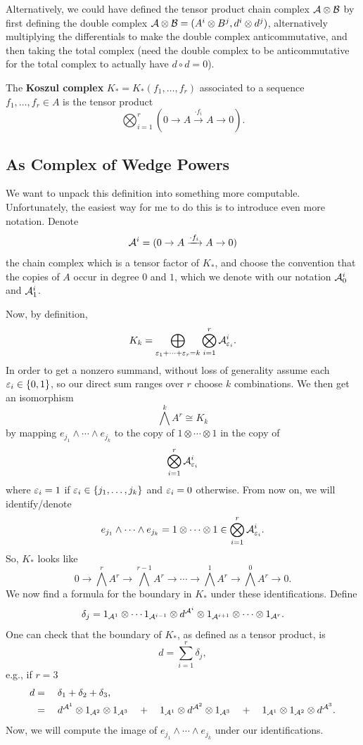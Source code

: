 \documentclass[12pt]{article}
\begin{document}
\begin{rmk}
    Alternatively, we could have defined the tensor product chain complex $\mathcal{A}\otimes \mathcal{B}$ by first defining the double complex $\mathcal{A}\otimes \mathcal{B} = (A^i\otimes B^j, d^i\otimes d^j)$, alternatively multiplying the differentials to make the double complex anticommutative, and then taking the total complex (need the double complex to be anticommutative for the total complex to actually have $d\circ d=0$).
\end{rmk}

\begin{defn}
    The \textbf{Koszul complex} $K_*=K_*(f_1,\dots,f_r)$ associated to a sequence $f_1,\dots,f_r \in A$ is the tensor product
    \[\bigotimes_{i=1}^r (0\to A \xrightarrow{\cdot f_i} A \to 0).\]
\end{defn}

\subsection{As Complex of Wedge Powers}

We want to unpack this definition into something more computable. Unfortunately, the easiest way for me to do this is to introduce even more notation. Denote
\[\mathcal{A}^i = (0\to A \xrightarrow{\cdot f_i} A\to 0)\]
the chain complex which is a tensor factor of $K_*$, and choose the convention that the copies of $A$ occur in degree $0$ and $1$, which we denote with our notation $\mathcal{A}^i_0$ and $\mathcal{A}^i_1$.

Now, by definition,
\[K_k = \bigoplus_{\varepsilon_1+\dots+\varepsilon_r=k} \bigotimes_{i=1}^r \mathcal{A}^i_{\varepsilon_i}.\]
In order to get a nonzero summand, without loss of generality assume each $\varepsilon_i \in \{0,1\}$, so our direct sum ranges over $r$ choose $k$ combinations. We then get an isomorphism
\[\bigwedge^k A^r \cong K_k\]
by mapping $e_{j_1}\wedge \cdots \wedge e_{j_k}$ to the copy of $1\otimes \cdots \otimes 1$ in the copy of
\[\bigotimes_{i=1}^r \mathcal{A}^i_{\varepsilon_i}\]
where $\varepsilon_i=1$ if $\varepsilon_i \in \{j_1,\dots,j_k\}$ and $\varepsilon_i=0$ otherwise. From now on, we will identify/denote
\[e_{j_1}\wedge \cdots \wedge e_{j_k} = 1\otimes \cdots \otimes 1 \in \bigotimes_{i=1}^r \mathcal{A}_{\varepsilon_i}^i.\]
So, $K_*$ looks like
\[0\to \bigwedge^r A^r \to \bigwedge^{r-1} A^r \to \cdots \to \bigwedge^1 A^r \to \bigwedge^0 A^r \to 0.\]
We now find a formula for the boundary in $K_*$ under these identifications. Define
\[\delta_j = 1_{\mathcal{A}^1} \otimes \cdots 1_{\mathcal{A}^{i-1}} \otimes d^{\mathcal{A}^i} \otimes 1_{\mathcal{A}^{i+1}} \otimes \cdots \otimes 1_{\mathcal{A}^r}.\]
One can check that the boundary of $K_*$, as defined as a tensor product, is
\[d = \sum_{i=1}^r \delta_j, \]
e.g., if $r=3$
\begin{align*}
    d &= \quad \delta_1 + \delta_2 + \delta_3,\\
    &= \quad d^{\mathcal{A}^1}\otimes 1_{\mathcal{A}^2} \otimes 1_{\mathcal{A}^3} \quad + \quad 1_{\mathcal{A}^1} \otimes d^{\mathcal{A}^2} \otimes 1_{\mathcal{A}^3} \quad + \quad 1_{\mathcal{A}^1} \otimes 1_{\mathcal{A}^2} \otimes d^{\mathcal{A}^3}.
\end{align*}
Now, we will compute the image of $e_{j_1}\wedge \cdots \wedge e_{j_k}$ under our identifications.
\end{document}
